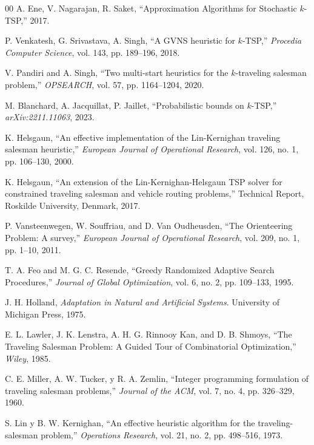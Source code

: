 \begin{thebibliography}{00}
 A. Ene, V. Nagarajan, R. Saket, 
``Approximation Algorithms for Stochastic $k$-TSP,'' 2017.

 P. Venkatesh, G. Srivastava, A. Singh, 
``A GVNS heuristic for $k$-TSP,'' 
\textit{Procedia Computer Science}, vol. 143, pp. 189--196, 2018.

 V. Pandiri and A. Singh, 
``Two multi-start heuristics for the $k$-traveling salesman problem,'' 
\textit{OPSEARCH}, vol. 57, pp. 1164--1204, 2020.

 M. Blanchard, A. Jacquillat, P. Jaillet, 
``Probabilistic bounds on $k$-TSP,'' 
\textit{arXiv:2211.11063}, 2023.

 K. Helsgaun, 
``An effective implementation of the Lin-Kernighan traveling salesman heuristic,'' 
\textit{European Journal of Operational Research}, vol. 126, no. 1, pp. 106--130, 2000.

 K. Helsgaun, 
``An extension of the Lin-Kernighan-Helsgaun TSP solver for constrained traveling salesman and vehicle routing problems,'' 
Technical Report, Roskilde University, Denmark, 2017.

 P. Vansteenwegen, W. Souffriau, and D. Van Oudheusden, 
``The Orienteering Problem: A survey,'' 
\textit{European Journal of Operational Research}, vol. 209, no. 1, pp. 1--10, 2011.

 T. A. Feo and M. G. C. Resende, 
``Greedy Randomized Adaptive Search Procedures,'' 
\textit{Journal of Global Optimization}, vol. 6, no. 2, pp. 109--133, 1995.

 J. H. Holland, 
\textit{Adaptation in Natural and Artificial Systems}. University of Michigan Press, 1975.

 E. L. Lawler, J. K. Lenstra, A. H. G. Rinnooy Kan, and D. B. Shmoys, 
``The Traveling Salesman Problem: A Guided Tour of Combinatorial Optimization,'' 
\textit{Wiley}, 1985.

 C. E. Miller, A. W. Tucker, y R. A. Zemlin, 
``Integer programming formulation of traveling salesman problems,'' 
\textit{Journal of the ACM}, vol. 7, no. 4, pp. 326--329, 1960.

 S. Lin y B. W. Kernighan, 
``An effective heuristic algorithm for the traveling-salesman problem,'' 
\textit{Operations Research}, vol. 21, no. 2, pp. 498--516, 1973.


\end{thebibliography}
